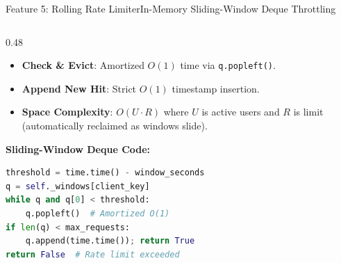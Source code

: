 \documentclass[aspectratio=169,10pt]{beamer}
\begin{document}
\begin{frame}[fragile,t]{Feature 5: Rolling Rate Limiter}{In-Memory Sliding-Window Deque Throttling}
\begin{columns}[t]
\begin{column}{0.48\textwidth}
      \begin{itemize}\setlength{\itemsep}{1.2pt}
        \item {\fontsize{8.0}{9.8}\selectfont \textbf{Check \& Evict}: Amortized $O(1)$ time via \texttt{q.popleft()}.}
        \item {\fontsize{8.0}{9.8}\selectfont \textbf{Append New Hit}: Strict $O(1)$ timestamp insertion.}
        \item {\fontsize{8.0}{9.8}\selectfont \textbf{Space Complexity}: $O(U \cdot R)$ where $U$ is active users and $R$ is limit (automatically reclaimed as windows slide).}
      \end{itemize}
      \vspace{0.1cm}
      {\fontsize{8.0}{10.0}\selectfont\textbf{\textcolor{KoinexaRed}{Sliding-Window Deque Code:}}}
\begin{lstlisting}[language=Python]
threshold = time.time() - window_seconds
q = self._windows[client_key]
while q and q[0] < threshold:
    q.popleft()  # Amortized O(1)
if len(q) < max_requests:
    q.append(time.time()); return True
return False  # Rate limit exceeded
\end{lstlisting}
    \end{column}
  \end{columns}
\end{frame}
\end{document}
